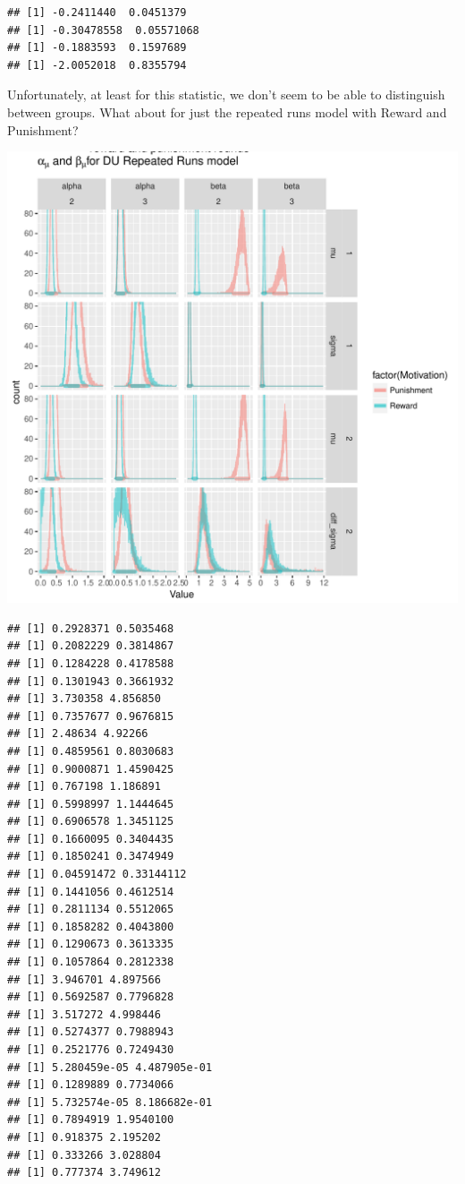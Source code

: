 \documentclass{article}\usepackage[]{graphicx}\usepackage[]{color}
\makeatletter
\def\maxwidth{ %
  \ifdim\Gin@nat@width>\linewidth
    \linewidth
  \else
    \Gin@nat@width
  \fi
}
\newenvironment{kframe}{%
 \def\at@end@of@kframe{}%
 \ifinner\ifhmode%
  \def\at@end@of@kframe{\end{minipage}}%
  \begin{minipage}{\columnwidth}%
 \fi\fi%
 \def\FrameCommand##1{\hskip\@totalleftmargin \hskip-\fboxsep
 \colorbox{shadecolor}{##1}\hskip-\fboxsep
     \hskip-\linewidth \hskip-\@totalleftmargin \hskip\columnwidth}%
 \MakeFramed {\advance\hsize-\width
   \@totalleftmargin\z@ \linewidth\hsize
   \@setminipage}}%
 {\par\unskip\endMakeFramed%
 \at@end@of@kframe}
\newenvironment{knitrout}{}{} %
\makeatother
\begin{document}
\begin{knitrout}
\begin{kframe}\begin{verbatim}
## [1] -0.2411440  0.0451379
## [1] -0.30478558  0.05571068
## [1] -0.1883593  0.1597689
## [1] -2.0052018  0.8355794
\end{verbatim}
\end{kframe}
\end{knitrout}

Unfortunately, at least for this statistic, we don't seem to be able to distinguish between groups. What about for just the repeated runs model with Reward and Punishment?

\begin{knitrout}
\color{fgcolor}
\includegraphics[width=\maxwidth]{figure/unnamed-chunk-8-1} 
\begin{kframe}\begin{verbatim}
## [1] 0.2928371 0.5035468
## [1] 0.2082229 0.3814867
## [1] 0.1284228 0.4178588
## [1] 0.1301943 0.3661932
## [1] 3.730358 4.856850
## [1] 0.7357677 0.9676815
## [1] 2.48634 4.92266
## [1] 0.4859561 0.8030683
## [1] 0.9000871 1.4590425
## [1] 0.767198 1.186891
## [1] 0.5998997 1.1444645
## [1] 0.6906578 1.3451125
## [1] 0.1660095 0.3404435
## [1] 0.1850241 0.3474949
## [1] 0.04591472 0.33144112
## [1] 0.1441056 0.4612514
## [1] 0.2811134 0.5512065
## [1] 0.1858282 0.4043800
## [1] 0.1290673 0.3613335
## [1] 0.1057864 0.2812338
## [1] 3.946701 4.897566
## [1] 0.5692587 0.7796828
## [1] 3.517272 4.998446
## [1] 0.5274377 0.7988943
## [1] 0.2521776 0.7249430
## [1] 5.280459e-05 4.487905e-01
## [1] 0.1289889 0.7734066
## [1] 5.732574e-05 8.186682e-01
## [1] 0.7894919 1.9540100
## [1] 0.918375 2.195202
## [1] 0.333266 3.028804
## [1] 0.777374 3.749612
\end{verbatim}
\end{kframe}
\end{knitrout}
\end{document}
